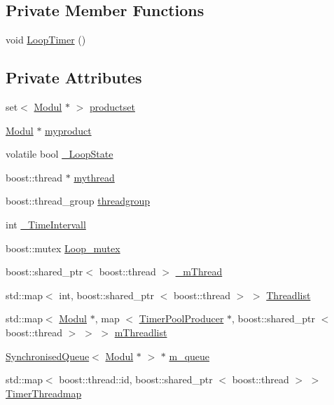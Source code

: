 \subsection*{\-Private \-Member \-Functions}
\begin{DoxyCompactItemize}
\item 
void \hyperlink{classTimerPoolProducer_aaa466ecb380111ab58a8dbdd2a6de2e0}{\-Loop\-Timer} ()
\end{DoxyCompactItemize}
\subsection*{\-Private \-Attributes}
\begin{DoxyCompactItemize}
\item 
set$<$ \hyperlink{classModul}{\-Modul} $\ast$ $>$ \hyperlink{classTimerPoolProducer_a8f115a7a158c1a87b7c0b69979056a58}{productset}
\item 
\hyperlink{classModul}{\-Modul} $\ast$ \hyperlink{classTimerPoolProducer_ad592323c1d91c4a8e05d44f71b84dfe4}{myproduct}
\item 
volatile bool \hyperlink{classTimerPoolProducer_a0819a9b4ae21ef164a7953308a6eba32}{\-\_\-\-Loop\-State}
\item 
boost\-::thread $\ast$ \hyperlink{classTimerPoolProducer_a769349d783a28489a9a2fa5809bb3e1c}{mythread}
\item 
boost\-::thread\-\_\-group \hyperlink{classTimerPoolProducer_a1c409ced920df021ed0d05965a42283d}{threadgroup}
\item 
int \hyperlink{classTimerPoolProducer_a414c9db407fb14cb1f0693951730567d}{\-\_\-\-Time\-Intervall}
\item 
boost\-::mutex \hyperlink{classTimerPoolProducer_aea1db7284a5712c3f10d20311a46a273}{\-Loop\-\_\-mutex}
\item 
boost\-::shared\-\_\-ptr$<$ boost\-::thread $>$ \hyperlink{classTimerPoolProducer_a26517aaf30ea382756cca86b719e07ea}{\-\_\-m\-Thread}
\item 
std\-::map$<$ int, \*
boost\-::shared\-\_\-ptr\*
$<$ boost\-::thread $>$ $>$ \hyperlink{classTimerPoolProducer_a2c4d13b344f41f350c195a113ed59d7a}{\-Threadlist}
\item 
std\-::map$<$ \hyperlink{classModul}{\-Modul} $\ast$, map\*
$<$ \hyperlink{classTimerPoolProducer}{\-Timer\-Pool\-Producer} \*
$\ast$, boost\-::shared\-\_\-ptr\*
$<$ boost\-::thread $>$ $>$ $>$ \hyperlink{classTimerPoolProducer_ac578fc91c74fa55190cd661fc892b8cc}{m\-Threadlist}
\item 
\hyperlink{classSynchronisedQueue}{\-Synchronised\-Queue}$<$ \hyperlink{classModul}{\-Modul} $\ast$ $>$ $\ast$ \hyperlink{classTimerPoolProducer_a1706efbc1e1a37f6fa05efb3fe5879f7}{m\-\_\-queue}
\item 
std\-::map$<$ boost\-::thread\-::id, \*
boost\-::shared\-\_\-ptr\*
$<$ boost\-::thread $>$ $>$ \hyperlink{classTimerPoolProducer_a5d112fbb99940e2e38d94ece39878cbd}{\-Timer\-Threadmap}
\end{DoxyCompactItemize}


